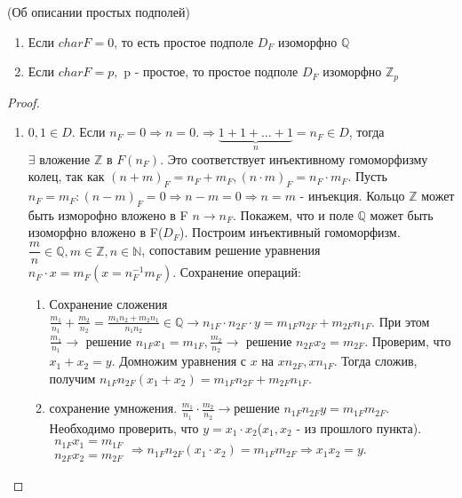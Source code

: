 \begin{theorem}
	(Об описании простых подполей) \newline
	\begin{enumerate}
		\item Если \(char F = 0\), то есть простое подполе \(D_F\) изоморфно \(\mathbb{Q}\)
		\item Если \(char F = p,\) p - простое, то простое подполе \(D_F\) изоморфно \(\mathbb{Z}_p\)
	\end{enumerate}
\end{theorem}
\begin{proof}
	\begin{enumerate}
		\item \(0,1\in D\). Если \(n_F = 0 \Longrightarrow n = 0. \Longrightarrow \underbrace{1+1+\ldots+1}_{n} = n_F\in D\), тогда \(\exists \text{ вложение }\mathbb{Z} \text{ в }F(n_F)\). 
		Это соответствует инъективному гомоморфизму колец, так как \((n+m)_F = n_F + m_F, (n\cdot m)_F = n_F\cdot m_F\). 
		Пусть \(n_F = m_F: (n-m)_F = 0 \Longrightarrow n - m = 0 \Longrightarrow n = m\) - инъекция. Кольцо \(\mathbb{Z}\) может быть изморофно вложено в F \(n\to n_F\). 
		Покажем, что и поле \(\mathbb{Q}\) может быть изоморфно вложено в F($D_F$). Построим инъективный гомоморфизм. \(\dfrac{m}{n}\in \mathbb{Q}, m\in\mathbb{Z}, n\in\mathbb{N}\), 
		сопоставим решение уравнения \(n_F\cdot x = m_F(x = n_F^{-1}m_F)\). Сохранение операций: 
		\begin{enumerate}
			\item Сохранение сложения \(\frac{m_1}{n_1}+\frac{m_2}{n_2} = \frac{m_1n_2+m_2n_1}{n_1n_2}\in\mathbb{Q}\to n_{1F}\cdot n_{2F}\cdot y = m_{1F}n_{2F} + m_{2F}n_{1F}\). 
			При этом \(\frac{m_1}{n_1}\to \text{ решение }n_{1F}x_1 = m_{1F}, \frac{m_2}{n_2}\to\text{ решение } n_{2F}x_2=m_{2F}\). Проверим, что \(x_1+x_2 = y\). 
			Домножим уравнения с \(x\) на \(xn_{2F}, xn_{1F}\). Тогда сложив, получим \(n_{1F}n_{2F} (x_1+x_2) = m_{1F}n_{2F}+m_{2F}n_{1F}\).
			\item сохранение умножения. \(\frac{m_1}{n_1}\cdot\frac{m_2}{n_2}\to \text{решение }n_{1F}n_{2F}y = m_{1F}m_{2F}\).
			 Необходимо проверить, что \(y = x_1\cdot x_2\)(\(x_1, x_2\) - из прошлого пункта). \(\begin{gathered}
			n_{1F}x_1 = m_{1F} \\
			n_{2F}x_2 = m_{2F}
			\end{gathered}\Longrightarrow n_{1F}n_{2F}(x_1\cdot x_2) = m_{1F}m_{2F}\Longrightarrow x_1x_2 = y\). 
		\end{enumerate}

\end{enumerate}
\end{proof}
